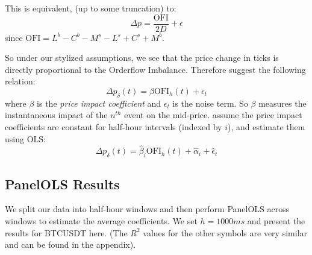 This is equivalent, (up to some truncation) to:
\begin{equation}
    \Delta p = \frac{\text{OFI}}{2D} + \epsilon
\end{equation}
since $\text{OFI} = L^b - C^b-M^s-L^s+C^s+M^b$.

So under our stylized assumptions, we see that the price change in ticks
is directly proportional to the Orderflow Imbalance.
Therefore \cite{CONT2013} suggest the following relation:
\begin{equation}
    \Delta p_{\delta}(t) = \beta \text{OFI}_h(t) + \epsilon_t \label{linearrelation}
\end{equation}
where $\beta$ is the \textit{price impact coefficient} and $\epsilon_t$ is the noise
term. So $\beta$ measures the instantaneous impact of the $n^{th}$ event on the mid-price. 
\cite{CONT2013} assume the price impact coefficients are constant for half-hour intervals (indexed by $i$),
and estimate them using OLS:
\begin{equation}
    \Delta p_{\delta}(t) = \hat{\beta}_i \text{OFI}_h(t) + \hat{\alpha}_i + \hat{\epsilon}_t
\end{equation}

\subsection{PanelOLS Results}
We split our data into half-hour windows and then perform PanelOLS across windows
to estimate the average coefficients. We set $h = 1000ms$ and present the results for
BTCUSDT here. (The $R^2$ values for the other symbols are very similar and can be found in the appendix).

